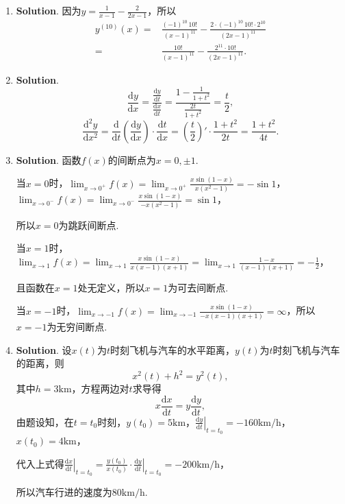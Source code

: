\documentclass[../main.tex]{subfiles}
\begin{document}
\begin{enumerate}
    \item \textbf{Solution}. 因为$y=\frac{1}{x-1}-\frac{2}{2x-1}$，所以
          \[
              \begin{aligned}
                  y^{(10)}(x) = {} & \frac{(-1)^{10}\,10!}{(x-1)^{11}}-\frac{2\cdot(-1)^{10}\,10!\cdot 2^{10}}{(2x-1)^{11}} \\
                  = {}             & \frac{10!}{(x-1)^{11}}-\frac{2^{11}\cdot 10!}{(2x-1)^{11}}.
              \end{aligned}
          \]

    \item \textbf{Solution}.
          \[
              \frac{\mathrm{d}y}{\mathrm{d}x}=\frac{\frac{\mathrm{d}y}{\mathrm{d}t}}{\frac{\mathrm{d}x}{\mathrm{d}t}}
              =\frac{1-\frac{1}{1+t^{2}}}{\frac{2t}{1+t^{2}}}=\frac{t}{2},
          \]
          \[
              \frac{\mathrm{d}^{2}y}{\mathrm{d}x^{2}}=\frac{\mathrm{d}}{\mathrm{d}t}\left
              (\frac{\mathrm{d}y}{\mathrm{d}x}\right)\cdot\frac{\mathrm{d}t}{\mathrm{d}x}
              =\left(\frac{t}{2}\right)'\cdot\frac{1+t^{2}}{2t}=\frac{1+t^{2}}{4t}.
          \]

    \item \textbf{Solution}. 函数$f(x)$的间断点为$x=0,\pm1$.

          当$x=0$时，$\lim_{x\to 0^+}f(x)=\lim_{x\to0^+}\frac{x\sin(1-x)}{x(x^{2}-1)}
              =-\sin 1$，$\lim_{x\to 0^-}f(x)=\lim_{x\to0^-}\frac{x\sin(1-x)}{-x(x^{2}-1)}
              =\sin 1$，

          所以$x=0$为跳跃间断点.

          当$x=1$时，$\lim_{x\to1}f(x)=\lim_{x\to1}\frac{x\sin(1-x)}{x(x-1)(x+1)}=\lim
              _{x\to1}\frac{1-x}{(x-1)(x+1)}=-\frac{1}{2}$，

          且函数在$x=1$处无定义，所以$x=1$为可去间断点.

          当$x=-1$时，$\lim_{x\to-1}f(x)=\lim_{x\to-1}\frac{x\sin(1-x)}{-x(x-1)(x+1)}
              =\infty$，所以$x=-1$为无穷间断点.

    \item \textbf{Solution}. 设$x(t)$为$t$时刻飞机与汽车的水平距离，$y(t)$为$t$时刻飞机与汽车的距离，则
          \[
              x^{2}(t)+h^{2}=y^{2}(t),
          \]
          其中$h=3\mathrm{km}$，方程两边对$t$求导得
          \[
              x\frac{\mathrm{d}x}{\mathrm{d}t}=y\frac{\mathrm{d}y}{\mathrm{d}t},
          \]
          由题设知，在$t=t_{0}$时刻，$y(t_{0})=5\mathrm{km}$，$\left.\frac{\mathrm{d}y}{\mathrm{d}t}
              \right|_{t=t_0}=-160\mathrm{km/h}$，$x(t_{0})=4\mathrm{km}$，

          代入上式得$\left.\frac{\mathrm{d}x}{\mathrm{d}t}\right|_{t=t_0}=\frac{y(t_{0})}{x(t_{0})}
              \cdot\left.\frac{\mathrm{d}y}{\mathrm{d}t}\right|_{t=t_0}=-200\mathrm{km/h}$，

          所以汽车行进的速度为$80\mathrm{km/h}$.
\end{enumerate}
\end{document}
